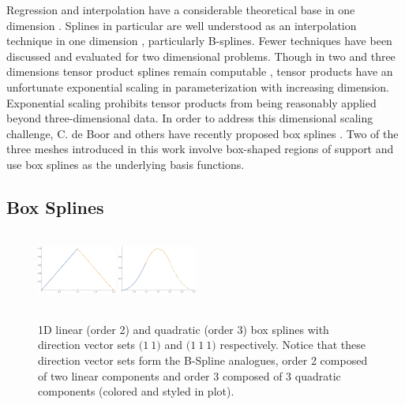 Regression and interpolation have a considerable theoretical base in one dimension \cite{cheney2009course}. Splines in particular are well understood as an interpolation technique in one dimension \cite{de1978practical}, particularly B-splines. Fewer techniques have been discussed and evaluated for two dimensional problems. Though in two and three dimensions tensor product splines remain computable \cite{unther1996interpolating}, tensor products have an unfortunate exponential scaling in parameterization with increasing dimension. Exponential scaling prohibits tensor products from being reasonably applied beyond three-dimensional data. In order to address this dimensional scaling challenge, C. de Boor and others have recently proposed box splines \cite{de2013box}. Two of the three meshes introduced in this work involve box-shaped regions of support and use box splines as the underlying basis functions.



\subsection{Box Splines}
\label{sec_box_splines}

\begin{figure}
  \includegraphics[width=0.23\textwidth,height=2.5cm]{1D-linear.pdf}
  \includegraphics[width=0.23\textwidth,height=2.5cm]{1D-quadratic.pdf}
  \caption{1D linear (order 2) and quadratic (order 3) box splines with direction vector sets $\bigl( 1 \ 1 \bigr)$ and $\bigl( 1 \ 1 \ 1 \bigr)$ respectively. Notice that these direction vector sets form the B-Spline analogues, order 2 composed of two linear components and order 3 composed of 3 quadratic components (colored and styled in plot).
  \vspace{-.5cm}}
  \label{fig_1D_boxes}
\end{figure}


